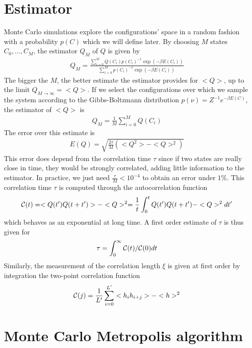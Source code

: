     \section{Estimator}

Monte Carlo simulations explore the configurations' space in a random fashion \cite{newman_monte_1999} with a probability $p(C)$ which we will define later. By choosing $M$ states ${C_0,...,C_M}$, the estimator $Q_M$ of $Q$ is given by
\begin{align}
    Q_M = \frac{\sum_{i=0}^M Q(C_i) p(C_i)^{-1} \exp(-\beta E(C_i))}{\sum_{i=0}^M  p(C_i)^{-1} \exp(-\beta E(C_i))}
\end{align}
The bigger the $M$, the better estimate the estimator provides for $<Q>$, up to the limit $Q_{M\to \infty} = <Q>$. If we select the configurations over which we sample the system according to the Gibbs-Boltzmann distribution $p(\nu) = Z^{-1} e^{-\beta E(C)}$, the estimator of $<Q>$ is
\begin{align}
    Q_M = \frac{1}{M} \sum_{i=0}^M Q(C_i)
\end{align}
The error over this estimate is
\begin{align}
	E(Q) = \sqrt{\frac{2 \tau}{M} (<Q^2>-<Q>^2)} 
\end{align}
This error does depend from the correlation time $\tau$ since if two states are really close in time, they would be strongly correlated, adding little information to the estimator. In practice, we just need $\frac{\tau}{M} \less 10^{-4}$ to obtain an error under $1\%$. This correlation time $\tau$ is computed through the autocorrelation function
\begin{align}
    \mathcal{C}(t) = <Q(t')Q(t+t')>- <Q>^2 = \frac{1}{t}\int_0^t Q(t')Q(t+t')-<Q>^2 dt' 
\end{align}
which behaves as an exponential at long time\cite{wansleben_monte_1991}. A first order estimate of $\tau$ is thus given for
\begin{align}
	\tau = \int_0^{\infty} \mathcal{C}(t)/\mathcal{C}(0) dt
	\label{tau_cor}
\end{align}
Similarly, the measurement of the correlation length $\xi$ is given at first order by integration the two-point correlation function
\begin{align}
\mathcal{C}(j) = \frac{1}{L'} \sum_{i=0}^{L'} <h_i h_{i+j}>-<h>^2 
\end{align}

    \section{Monte Carlo Metropolis algorithm}

